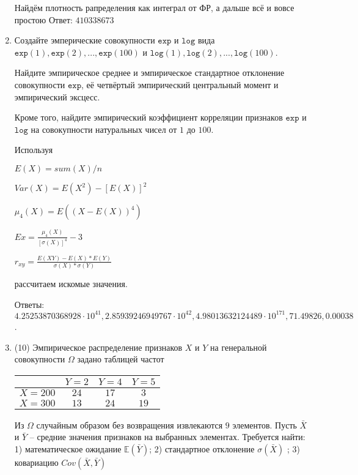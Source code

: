 \documentclass[a4paper,12pt]{article}
\begin{document}
\begin{enumerate}
Найдём плотность рапределения как интеграл от ФР, а дальше всё и вовсе простою Ответ: $410338673$


\item

    
    Создайте эмперические совокупности  $\mathtt{\text{exp}}$ и $\mathtt{\text{log}}$ вида $\mathtt{\text{exp}}(1),\mathtt{\text{exp}}(2), ..., \mathtt{\text{exp}}(100) $ и $\mathtt{\text{log}}(1),\mathtt{\text{log}}(2), ..., \mathtt{\text{log}}(100). $

    Найдите эмпирическое среднее и эмпирическое стандартное отклонение совокупности $\mathtt{\text{exp}}$, её четвёртый эмпирический центральный момент и эмпирический эксцесс.

    Кроме того, найдите эмпирический коэффициент корреляции признаков $\mathtt{\text{exp}}$ и $\mathtt{\text{log}}$ на совокупности натуральных чисел от $1$ до $100$.
    


    
    Используя

	$E(X) = sum(X) / n$

	$Var(X) = E(X^2) - [E(X)]^2$

	$\mu_4(X) = E((X-E(X))^4)$

	$Ex = \frac{\mu_4(X)}{[\sigma(X)]^4} - 3$

	$r_{xy} = \frac{E(XY) - E(X) * E(Y)}{\sigma(X) * \sigma(Y)}$

    рассчитаем искомые значения.

    Ответы: $4.25253870368928 \cdot 10^{41}, 2.85939246949767 \cdot 10^{42}, 4.98013632124489 \cdot 10^{171}, 71.49826, 0.00038$.

    

\item


(10) Эмпирическое распределение признаков $X$ и $Y$ на генеральной совокупности $\Omega$ задано таблицей частот  
 
\begin{tabular}{ | c | c | c | c | }
\hline
 & $Y = 2$ & $Y = 4$ & $Y = 5$  \\ \hline
$X = 200$ & $24$ & $17$ & $3$\\ \hline
$X = 300$ & $13$ & $24$ & $19$\\
\hline
\end{tabular}

Из $\Omega$ случайным образом без возвращения извлекаются $9$ элементов. 
Пусть $\bar X$ и $\bar Y$ – средние значения признаков на выбранных элементах. 
Требуется найти: 1) математическое ожидание $\mathbb{E}(\bar Y)$; 2) стандартное отклонение $\sigma(\bar X)$ ; 
3) ковариацию $Cov(\bar X, \bar Y)$





\end{enumerate}
\end{document}
